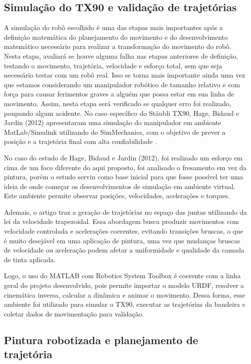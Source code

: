 \subsection{Simulação do TX90 e validação de trajetórias}

A simulação do robô escolhido é uma das etapas mais importantes após a definição matemática do planejamento do movimento e do desenvolvimento matemático necessário para realizar a transformação do movimento do robô. Nesta etapa, avaliará se houve alguma falha nas etapas anteriores de definição, testando o movimento, trajetória, velocidade e esforço total, sem que seja necessário testar com um robô real. Isso se torna mais importante ainda uma vez que estamos considerando um manipulador robótico de tamanho relativo e com força para causar ferimentos graves a alguém que possa estar em sua linha de movimento. Assim, nesta etapa será verificado se qualquer erro foi realizado, poupando algum acidente. No caso específico do Stäubli TX90, Hage, Bidaud e Jardin (2012) apresentaram uma simulação do manipulador em ambiente MatLab/Simulink utilizando do SimMechanics, com o objetivo de prever a posição e a trajetória final com alta confiabilidade \cite{hage2012}.

No caso do estudo de Hage, Bidaud e Jardin (2012), foi realizado um esforço em cima de um foco diferente do aqui proposto, foi analisado o fresamento em vez da pintura, porém o estudo serviu como base inicial para que fosse possível ter uma ideia de onde começar os desenvolvimentos de simulação em ambiente virtual. Este ambiente permite observar posições, velocidades, acelerações e torques.

Ademais, o artigo traz a geração de trajetórias no espaço das juntas utilizando da lei da velocidade trapezoidal. Essa abordagem busca produzir movimentos com velocidade controlada e acelerações coerentes, evitando transições bruscas, o que é muito desejável em uma aplicação de pintura, uma vez que mudanças bruscas de velocidade ou aceleração podem afetar a uniformidade e qualidade da camada de tinta aplicada.

Logo, o uso do MATLAB com Robotics System Toolbox é coerente com a linha geral do projeto desenvolvido, pois permite importar o modelo URDF, resolver a cinemática inversa, calcular a dinâmica e animar o movimento. Dessa forma, esse ambiente foi utilizado para simular o TX90, executar as trajetórias da bandeira e coletar dados de movimentação para validação.

\subsection{Pintura robotizada e planejamento de trajetória}

